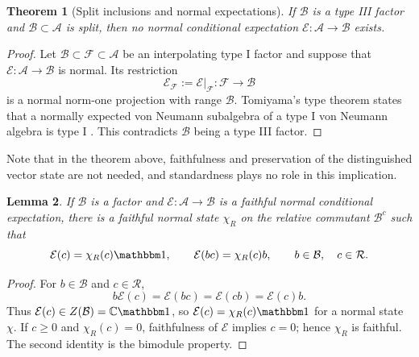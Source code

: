 \documentclass[a4paper,11pt]{article}
\newtheorem{theorem}{Theorem}
\newtheorem{lemma}[theorem]{Lemma}
\theoremstyle{definition}
\newcommand{\mA}{\mathcal{A}}
\newcommand{\mB}{\mathcal{B}}
\newcommand{\mE}{\mathcal{E}}
\begin{document}


\begin{theorem}[Split inclusions and normal expectations]\label{thm:split-no-expectation}
If $\mB$ is a type III factor and
$\mB\subset\mA$ is split, then no normal conditional expectation
$\mE:\mA\to\mB$ exists.  
\end{theorem}

\begin{proof}
Let $\mB\subset\mathcal F\subset\mA$ be an interpolating type I
factor and suppose that $\mE:\mA\to \mB$ is normal.  Its restriction
\begin{equation}
 \mE_{\mathcal F}:=\mE|_{\mathcal F}:\mathcal F\longrightarrow\mB
\end{equation}
is a normal norm-one projection with range $\mathcal B$.  Tomiyama's type
theorem states that a normally expected von Neumann subalgebra of a type I von
Neumann algebra is type I \cite{Tomiyama1959}\cite{Takesaki1972}. This contradicts $\mB$ being a type III factor.
\end{proof}

Note that in the theorem above, faithfulness and preservation of the
distinguished vector state are not needed, and 
standardness plays no role in this implication.

\begin{lemma}\label{lem:expectation-slice}
If $\mathcal B$ is a factor and $\mE:\mathcal A\to\mathcal B$ is a faithful
normal conditional expectation, there is a faithful normal state $\chi_R$ on
the relative commutant $\mB^c$ such that
\begin{equation}
 \mE(c)=\chi_R(c)\mathbbm 1,
 \qquad \mE(b c)=\chi_R(c)b,
 \qquad b\in\mathcal B,\quad c\in\mathcal R.
\end{equation}
\end{lemma}

\begin{proof}
For $b\in\mathcal B$ and $c\in\mathcal R$,
\begin{equation}
 b \mE(c)=\mE(b c)=\mE(c b)=\mE(c)b.
\end{equation}
Thus $\mE(c)\in Z(\mathcal B)=\mathbb C\mathbbm 1$, so
$\mE(c)=\chi_R(c)\mathbbm 1$ for a normal state $\chi$.  If $c\geq0$ and
$\chi_R(c)=0$, faithfulness of $\mE$ implies $c=0$; hence $\chi_R$ is faithful.  The
second identity is the bimodule property.
\end{proof}
\end{document}
